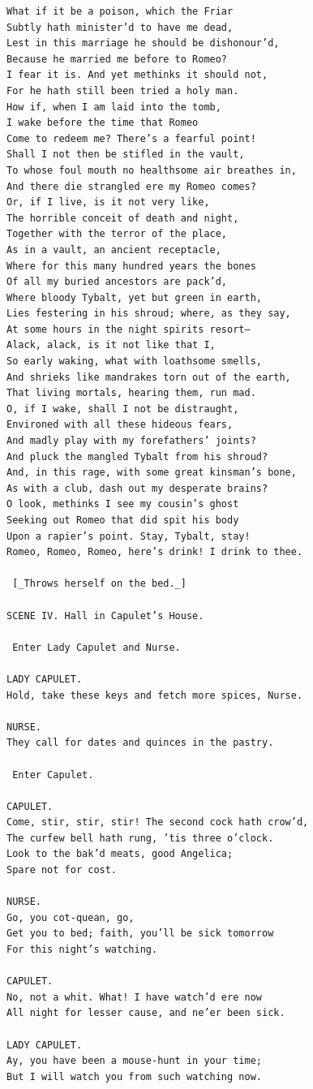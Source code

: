\documentclass{article}
\begin{document}
\begin{verbatim}
What if it be a poison, which the Friar
Subtly hath minister’d to have me dead,
Lest in this marriage he should be dishonour’d,
Because he married me before to Romeo?
I fear it is. And yet methinks it should not,
For he hath still been tried a holy man.
How if, when I am laid into the tomb,
I wake before the time that Romeo
Come to redeem me? There’s a fearful point!
Shall I not then be stifled in the vault,
To whose foul mouth no healthsome air breathes in,
And there die strangled ere my Romeo comes?
Or, if I live, is it not very like,
The horrible conceit of death and night,
Together with the terror of the place,
As in a vault, an ancient receptacle,
Where for this many hundred years the bones
Of all my buried ancestors are pack’d,
Where bloody Tybalt, yet but green in earth,
Lies festering in his shroud; where, as they say,
At some hours in the night spirits resort—
Alack, alack, is it not like that I,
So early waking, what with loathsome smells,
And shrieks like mandrakes torn out of the earth,
That living mortals, hearing them, run mad.
O, if I wake, shall I not be distraught,
Environed with all these hideous fears,
And madly play with my forefathers’ joints?
And pluck the mangled Tybalt from his shroud?
And, in this rage, with some great kinsman’s bone,
As with a club, dash out my desperate brains?
O look, methinks I see my cousin’s ghost
Seeking out Romeo that did spit his body
Upon a rapier’s point. Stay, Tybalt, stay!
Romeo, Romeo, Romeo, here’s drink! I drink to thee.

 [_Throws herself on the bed._]

SCENE IV. Hall in Capulet’s House.

 Enter Lady Capulet and Nurse.

LADY CAPULET.
Hold, take these keys and fetch more spices, Nurse.

NURSE.
They call for dates and quinces in the pastry.

 Enter Capulet.

CAPULET.
Come, stir, stir, stir! The second cock hath crow’d,
The curfew bell hath rung, ’tis three o’clock.
Look to the bak’d meats, good Angelica;
Spare not for cost.

NURSE.
Go, you cot-quean, go,
Get you to bed; faith, you’ll be sick tomorrow
For this night’s watching.

CAPULET.
No, not a whit. What! I have watch’d ere now
All night for lesser cause, and ne’er been sick.

LADY CAPULET.
Ay, you have been a mouse-hunt in your time;
But I will watch you from such watching now.


\end{verbatim}
\end{document}
